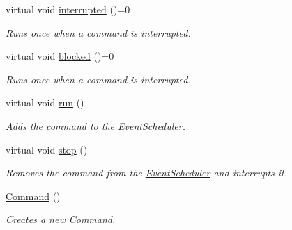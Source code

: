 \begin{DoxyCompactItemize}
\mbox{\label{classlib_iterative_robot_1_1_command_a1c17b601d1b69822cabadb92069d1747}} 
virtual void \mbox{\hyperlink{classlib_iterative_robot_1_1_command_a1c17b601d1b69822cabadb92069d1747}{interrupted}} ()=0
\begin{DoxyCompactList}\small\item\em Runs once when a command is interrupted. \end{DoxyCompactList}\item 
\mbox{\label{classlib_iterative_robot_1_1_command_ab718f2780211fd0bc61af524e94555a2}} 
virtual void \mbox{\hyperlink{classlib_iterative_robot_1_1_command_ab718f2780211fd0bc61af524e94555a2}{blocked}} ()=0
\begin{DoxyCompactList}\small\item\em Runs once when a command is interrupted. \end{DoxyCompactList}\item 
\mbox{\label{classlib_iterative_robot_1_1_command_a3f3790d1b8033d7253a9f44481032ee9}} 
virtual void \mbox{\hyperlink{classlib_iterative_robot_1_1_command_a3f3790d1b8033d7253a9f44481032ee9}{run}} ()
\begin{DoxyCompactList}\small\item\em Adds the command to the \mbox{\hyperlink{classlib_iterative_robot_1_1_event_scheduler}{Event\+Scheduler}}. \end{DoxyCompactList}\item 
\mbox{\label{classlib_iterative_robot_1_1_command_ac91308101424f447f80665244b554171}} 
virtual void \mbox{\hyperlink{classlib_iterative_robot_1_1_command_ac91308101424f447f80665244b554171}{stop}} ()
\begin{DoxyCompactList}\small\item\em Removes the command from the \mbox{\hyperlink{classlib_iterative_robot_1_1_event_scheduler}{Event\+Scheduler}} and interrupts it. \end{DoxyCompactList}\item 
\mbox{\hyperlink{classlib_iterative_robot_1_1_command_a18df2d81039392daeb0b78c346a70537}{Command}} ()
\begin{DoxyCompactList}\small\item\em Creates a new \mbox{\hyperlink{classlib_iterative_robot_1_1_command}{Command}}. \end{DoxyCompactList}\end{DoxyCompactItemize}
